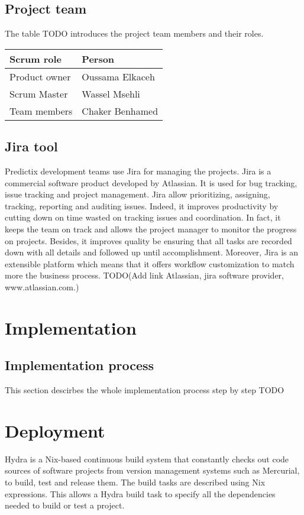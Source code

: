 \subsection{Project team}
The table TODO introduces the project team members and their roles.

\begin{center}
  \begin{tabular}{ | p{3cm}  | p{6cm} |}
    \hline

    Scrum role    & Person          \\ \hline

    Product owner & Oussama Elkaceh \\ \hline
    Scrum Master  & Wassel Msehli   \\ \hline
    Team members  & Chaker Benhamed \\ \hline

    \hline
  \end{tabular}
\end{center}

\subsection{Jira tool}
Predictix development teams use Jira for managing the projects. Jira is a
commercial software product developed by Atlassian. It is used for bug tracking,
issue tracking and project management. Jira allow prioritizing, assigning,
tracking, reporting and auditing issues. Indeed, it improves productivity by
cutting down on time wasted on tracking issues and coordination. In fact, it
keeps the team on track and allows the project manager to monitor the progress
on projects. Besides, it improves quality be ensuring that all tasks are
recorded down with all details and followed up until accomplishment. Moreover,
Jira is an extensible platform which means that it offers workflow
customization to match more the business process. TODO(Add link Atlassian, jira software provider, www.atlassian.com.)


\section{Implementation}
\subsection{Implementation process}
This section descirbes the whole implementation process step by step TODO

\section{Deployment}
Hydra is a Nix-based continuous build system that constantly checks out code
sources of software projects from version management systems such as
Mercurial, to build, test and release them. The build tasks are described using
Nix expressions. This allows a Hydra build task to specify all the dependencies
needed to build or test a project.

